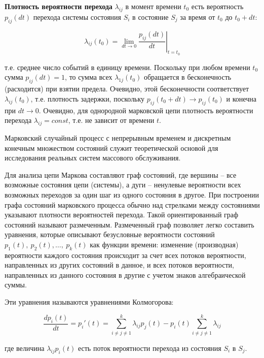 	\textbf{Плотность вероятности перехода} $\lambda_{ij}$ в момент времени $t_0$ есть вероятность $p_{ij}(dt)$ перехода системы состояния $S_i$ в состояние $S_j$ за время от $t_0$ до $t_0+dt$:
	
	\begin{equation}\label{eq5}
		\lambda_{ij}(t_0) = \lim\limits_{dt\to 0}\left.\frac{p_{ij}(dt)}{dt}\right|_{t = t_0}
	\end{equation}
	
	т.е. среднее число событий в единицу времени. Поскольку при любом времени $t_0$ сумма $p_{ij}(dt)=1$, то сумма всех $\lambda_{1j}(t_0)$ обращается в бесконечность (расходится) при взятии предела. Очевидно, этой бесконечности соответствует $\lambda_{ij}(t_0)$, т.е. плотность задержки, поскольку $p_{ij}(t_0+dt)\to p_{ij}(t_0)$ и конечна при $dt\to 0$. Очевидно, для однородной марковской цепи плотность вероятности перехода $\lambda_{ij}=const$, т.е. не зависит от времени $t$.
	
	Марковский случайный процесс с непрерывным временем и дискретным конечным множеством состояний служит теоретической основой для исследования реальных систем массового обслуживания.
	
	Для анализа цепи Маркова составляют граф состояний, где вершины -- все возможные состояния цепи (системы), а дуги -- ненулевые вероятности всех возможных переходов за один шаг из одного состояния в другое. При построении графа состояний марковского процесса обычно над стрелками между состояниями указывают плотности вероятностей перехода. Такой ориентированный граф состояний называют размеченным. Размеченный граф позволяет легко составить уравнения, которые описывают безусловные вероятности состояний $p_1(t),~p_2(t),\dots,~p_k(t)$ как функции времени: изменение (производная) вероятности каждого состояния происходит за счет всех потоков вероятности, направленных из других состояний в данное, и всех потоков вероятности, направленных из данного состояния в другие с учетом знаков алгебраической суммы.
	
	Эти уравнения называются уравнениями Колмогорова:
	
	\begin{equation}\label{eq6}
		\frac{dp_i(t)}{dt} = p_i'(t) = \sum_{i\neq j\neq 1}^{k}\lambda_{ij}p_j(t) - p_i(t)\sum_{i\neq j\neq 1}^{k}\lambda_{ij}
	\end{equation}
	
	где величина $\lambda_{ij}p_i(t)$ есть поток вероятности перехода из состояния $S_i$ в $S_j$.
